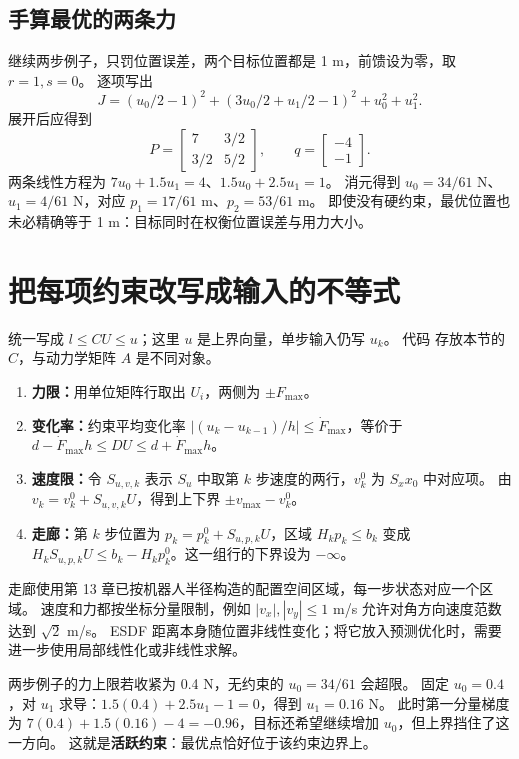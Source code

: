 \subsection{手算最优的两条力}
继续两步例子，只罚位置误差，两个目标位置都是 1 m，前馈设为零，取 $r=1,s=0$。
逐项写出
\[
 J=(u_0/2-1)^2+(3u_0/2+u_1/2-1)^2+u_0^2+u_1^2.
\]
展开后应得到
\[
 P=\begin{bmatrix}7&3/2\\3/2&5/2\end{bmatrix},\qquad q=\begin{bmatrix}-4\\-1\end{bmatrix}.
\]
两条线性方程为 $7u_0+1.5u_1=4$、$1.5u_0+2.5u_1=1$。
消元得到 $u_0=34/61$ N、$u_1=4/61$ N，对应 $p_1=17/61$ m、$p_2=53/61$ m。
即使没有硬约束，最优位置也未必精确等于 1 m：目标同时在权衡位置误差与用力大小。

\section{把每项约束改写成输入的不等式}
统一写成 $l\leq CU\leq u$；这里 $u$ 是上界向量，单步输入仍写 $u_k$。
代码  存放本节的 $C$，与动力学矩阵 $A$ 是不同对象。
\begin{enumerate}
\item \textbf{力限：}用单位矩阵行取出 $U_i$，两侧为 $\pm F_{\max}$。
\item \textbf{变化率：}约束平均变化率 $|(u_k-u_{k-1})/h|\leq\dot F_{\max}$，等价于
$d-\dot F_{\max}h\leq DU\leq d+\dot F_{\max}h$。
\item \textbf{速度限：}令 $S_{u,v,k}$ 表示 $S_u$ 中取第 $k$ 步速度的两行，$v_k^0$ 为 $S_xx_0$ 中对应项。
由 $v_k=v_k^0+S_{u,v,k}U$，得到上下界 $\pm v_{\max}-v_k^0$。
\item \textbf{走廊：}第 $k$ 步位置为 $p_k=p_k^0+S_{u,p,k}U$，区域 $H_kp_k\leq b_k$ 变成
$H_kS_{u,p,k}U\leq b_k-H_kp_k^0$。这一组行的下界设为 $-\infty$。
\end{enumerate}
走廊使用第 13 章已按机器人半径构造的配置空间区域，每一步状态对应一个区域。
速度和力都按坐标分量限制，例如 $|v_x|,|v_y|\leq1$ m/s 允许对角方向速度范数达到 $\sqrt2$ m/s。
ESDF 距离本身随位置非线性变化；将它放入预测优化时，需要进一步使用局部线性化或非线性求解。

两步例子的力上限若收紧为 0.4 N，无约束的 $u_0=34/61$ 会超限。
固定 $u_0=0.4$，对 $u_1$ 求导：$1.5(0.4)+2.5u_1-1=0$，得到 $u_1=0.16$ N。
此时第一分量梯度为 $7(0.4)+1.5(0.16)-4=-0.96$，目标还希望继续增加 $u_0$，但上界挡住了这一方向。
这就是\textbf{活跃约束}：最优点恰好位于该约束边界上。

